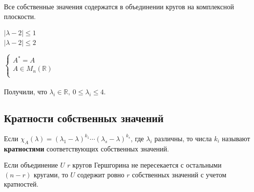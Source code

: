 Все собственные значения содержатся в объединении кругов на комплексной плоскости.\\
\begin{center}
    $|\lambda-2|\leqslant 1$\\
    $|\lambda-2|\leqslant 2$
\end{center}
$
\left\{
\begin{array}{lcl}
A^*=A \\
A\in M_n(\mathbb{R}) \\
\end{array}
\right.
$\\ \\
Получили, что $\lambda_i\in \mathbb{R},~0\leqslant\lambda_i\leqslant 4$.

\subsection{Кратности собственных значений}
\begin{definition}
    Если $\chi_A(\lambda)=(\lambda_1-\lambda)^{k_1}\cdots(\lambda_s-\lambda)^{k_s}$, где $\lambda_i$ различны, то числа $k_i$ называют \textbf{кратностями} соответствующих собственных значений.
\end{definition}
\begin{theorem} Если объединение $U$ $r$ кругов Гершгорина не пересекается с остальными $(n-r)$ кругами, то $U$ содержит ровно $r$ собственных значений с учетом кратностей.
\end{theorem}
